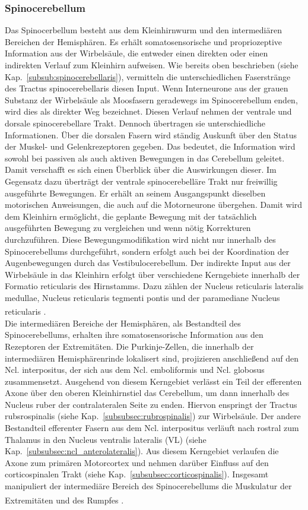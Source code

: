 \documentclass[12pt,a4paper,pdftex]{article}
\begin{document}
\subsubsection*{Spinocerebellum} 
Das Spinocerbellum besteht aus dem Kleinhirnwurm und den intermediären Bereichen der Hemisphären. Es erhält somatosensorische und propriozeptive Information aus der Wirbelsäule, die entweder einen direkten oder einen indirekten Verlauf zum Kleinhirn aufweisen. Wie bereits oben beschrieben (siehe Kap.~\ref{subsub:spinocerebellaris}), vermitteln  die unterschiedlichen Faserstränge des Tractus spinocerebellaris diesen Input. Wenn Interneurone aus der grauen Substanz der Wirbelsäule als Moosfasern geradewegs im Spinocerebellum enden, wird dies als direkter Weg bezeichnet. Diesen Verlauf nehmen der ventrale und dorsale spinocerebellare Trakt. Dennoch übertragen sie unterschiedliche Informationen. Über die dorsalen Fasern wird ständig Auskunft über den Status der Muskel- und Gelenkrezeptoren gegeben. Das bedeutet, die Information wird sowohl bei passiven als auch aktiven Bewegungen in das Cerebellum geleitet. Damit verschafft es sich einen Überblick über die Auswirkungen dieser. Im Gegensatz dazu überträgt der ventrale spinocerebelläre Trakt nur freiwillig ausgeführte Bewegungen. Er erhält an seinem Ausgangspunkt dieselben motorischen Anweisungen, die auch auf die Motorneurone übergehen. Damit wird dem Kleinhirn ermöglicht, die geplante Bewegung mit der tatsächlich ausgeführten Bewegung zu vergleichen und wenn nötig Korrekturen durchzuführen. Diese Bewegungsmodifikation wird nicht nur innerhalb des Spinocerebellums durchgeführt, sondern erfolgt auch bei der Koordination der Augenbewegungen durch das Vestibulocerebellum. Der indirekte Input aus der Wirbelsäule in das Kleinhirn erfolgt über verschiedene Kerngebiete innerhalb der Formatio reticularis des Hirnstamms. Dazu zählen der Nucleus reticularis lateralis medullae, Nucleus reticularis tegmenti pontis und der paramediane Nucleus reticularis \textsuperscript{\cite[42]{kandel2013principles}}. \\ 
Die intermediären Bereiche der Hemisphären, als Bestandteil des Spinocerebellums, erhalten ihre somatosensorische Information aus den Rezeptoren der Extremitäten. Die Purkinje-Zellen, die innerhalb der intermediären Hemisphärenrinde lokalisert sind, projizieren anschließend auf den Ncl. interpositus, der sich aus dem Ncl. emboliformis und Ncl. globosus zusammensetzt. Ausgehend von diesem Kerngebiet verlässt ein Teil der efferenten Axone über den oberen Kleinhirnstiel das Cerebellum, um dann innerhalb des Nucleus ruber der contralateralen Seite zu enden. Hiervon enspringt der Tractus rubsrospinalis (siehe Kap.~\ref{subsubsec:rubrospinalis}) zur Wirbelsäule. Der andere Bestandteil efferenter Fasern aus dem Ncl. interpositus verläuft nach rostral zum Thalamus in den Nucleus ventralis lateralis (VL) (siehe Kap.~\ref{subsubsec:ncl_anterolateralis}). Aus diesem Kerngebiet verlaufen die Axone zum primären Motorcortex und nehmen darüber Einfluss auf den corticospinalen Trakt (siehe Kap.~\ref{subsubsec:corticospinalis}). Insgesamt manipuliert der intermediäre Bereich des Spinocerebellums die Muskulatur der Extremitäten und des Rumpfes \textsuperscript{\cite[42]{kandel2013principles}}. \\   
\end{document}
